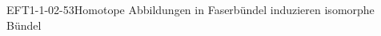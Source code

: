 
\begin{KORO}{EFT1-1-02-53}{Homotope Abbildungen in Faserbündel induzieren isomorphe Bündel}
\end{KORO}
